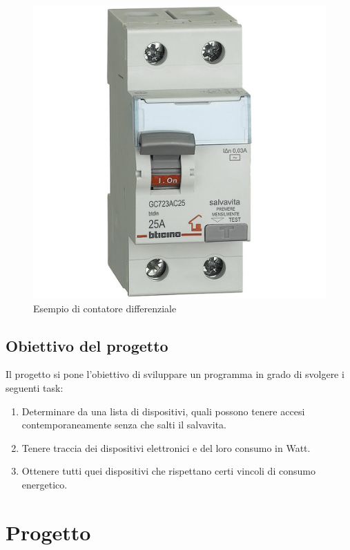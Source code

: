 \documentclass[12pt, letterpaper]{article}
\begin{document}
\begin{figure}
    \centering
    \includegraphics[scale=0.2]{interruttore-diff.jpg}
    \caption{Esempio di contatore differenziale}
\end{figure}


\subsection{Obiettivo del progetto}

Il progetto si pone l'obiettivo di sviluppare un programma in grado di svolgere
i seguenti task:

\begin{enumerate}
    \item Determinare da una lista di dispositivi, quali possono tenere accesi contemporaneamente
          senza che salti il salvavita.
    \item Tenere traccia dei dispositivi elettronici e del loro consumo in Watt.
    \item Ottenere tutti quei dispositivi che rispettano certi vincoli di consumo energetico.
\end{enumerate}

\section{Progetto}
\end{document}
